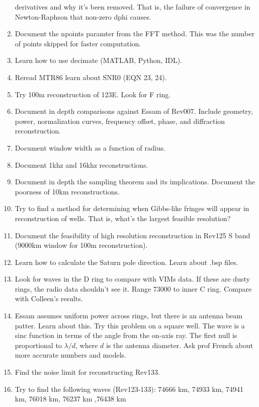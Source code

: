 \documentclass[crop=false,class=article,oneside]{standalone}
\begin{document}
\begin{enumerate}
                  derivatives and why it's been removed. That is,
                  the failure of convergence in Newton-Raphson that
                  non-zero dphi causes.
            \item Document the npoints paramter from the FFT method.
                  This was the number of points skipped for faster
                  computation.
            \item Learn how to use decimate (MATLAB, Python, IDL).
            \item Reread MTR86 learn about SNR0 (EQN 23, 24).
            \item Try 100m reconstruction of 123E. Look for F ring.
            \item Document in depth comparisons against Essam of Rev007.
                  Include geometry, power, normalization curves,
                  frequency offset, phase, and diffraction
                  reconstruction.
            \item Document window width as a function of radius.
            \item Document 1khz and 16khz reconstructions.
            \item Document in depth the sampling theorem and its
                  implications. Document the poorness of 10km
                  reconstructions.
            \item Try to find a method for determining when Gibbs-like
                  fringes will appear in reconstruction of wells. That is,
                  what's the largest feasible resolution?
            \item Document the feasibility of high resolution
                  reconstruction in Rev125 S band
                  (9000km window for 100m reconstruction).
            \item Learn how to calculate the Saturn pole direction.
                  Learn about .bsp files.
            \item Look for waves in the D ring to compare with VIMs data.
                  If these are dusty rings, the radio data shouldn't
                  see it. Range 73000 to inner C ring. Compare with
                  Colleen's results.
            \item Essam assumes uniform power across rings, but there is
                  an antenna beam patter. Learn about this. Try this
                  problem on a square well. The wave is a sinc function
                  in terms of the angle from the on-axis ray.
                  The first null is proportional to $\lambda/d$, where
                  $d$ is the antenna diameter. Ask prof French about
                  more accurate numbers and models.
            \item Find the noise limit for reconstructing Rev133.
            \item Try to find the following waves (Rev123-133):
                  74666 km, 74933 km, 74941 km, 76018 km,
                  76237 km ,76438 km
        \end{enumerate}
\end{document}
